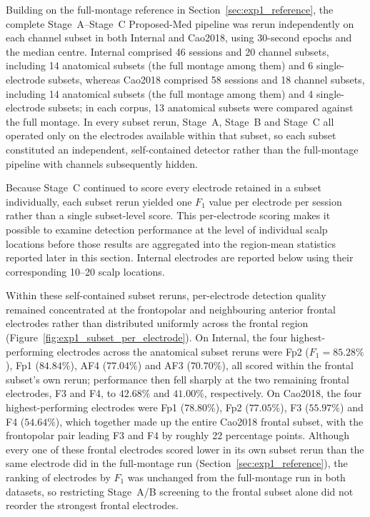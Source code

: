 Building on the full-montage reference in Section~\ref{sec:exp1_reference}, the complete Stage~A--Stage~C Proposed-Med pipeline was rerun independently on each channel subset in both Internal and Cao2018, using 30-second epochs and the median centre. Internal comprised 46 sessions and 20 channel subsets, including 14 anatomical subsets (the full montage among them) and 6 single-electrode subsets, whereas Cao2018 comprised 58 sessions and 18 channel subsets, including 14 anatomical subsets (the full montage among them) and 4 single-electrode subsets; in each corpus, 13 anatomical subsets were compared against the full montage. In every subset rerun, Stage~A, Stage~B and Stage~C all operated only on the electrodes available within that subset, so each subset constituted an independent, self-contained detector rather than the full-montage pipeline with channels subsequently hidden.

Because Stage~C continued to score every electrode retained in a subset individually, each subset rerun yielded one $F_1$ value per electrode per session rather than a single subset-level score. This per-electrode scoring makes it possible to examine detection performance at the level of individual scalp locations before those results are aggregated into the region-mean statistics reported later in this section. Internal electrodes are reported below using their corresponding 10--20 scalp locations.

Within these self-contained subset reruns, per-electrode detection quality remained concentrated at the frontopolar and neighbouring anterior frontal electrodes rather than distributed uniformly across the frontal region (Figure~\ref{fig:exp1_subset_per_electrode}). On Internal, the four highest-performing electrodes across the anatomical subset reruns were Fp2 ($F_1=85.28\%$), Fp1 ($84.84\%$), AF4 ($77.04\%$) and AF3 ($70.70\%$), all scored within the frontal subset's own rerun; performance then fell sharply at the two remaining frontal electrodes, F3 and F4, to $42.68\%$ and $41.00\%$, respectively. On Cao2018, the four highest-performing electrodes were Fp1 ($78.80\%$), Fp2 ($77.05\%$), F3 ($55.97\%$) and F4 ($54.64\%$), which together made up the entire Cao2018 frontal subset, with the frontopolar pair leading F3 and F4 by roughly 22 percentage points. Although every one of these frontal electrodes scored lower in its own subset rerun than the same electrode did in the full-montage run (Section~\ref{sec:exp1_reference}), the ranking of electrodes by $F_1$ was unchanged from the full-montage run in both datasets, so restricting Stage~A/B screening to the frontal subset alone did not reorder the strongest frontal electrodes.

